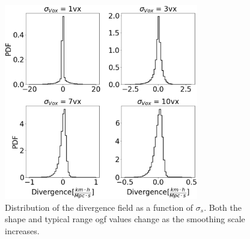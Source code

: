 \documentclass[usenatbib]{mnras}
\begin{document}
\begin{figure}
    \centering
    \includegraphics[width=240pt]{smooth_grad_dist.pdf}
    \caption{Distribution of the divergence field as a function of
      $\sigma_s$.
    Both the shape and typical range ogf values change as the
    smoothing scale increases.} 
    \label{fig:smooth_grad_dist}
\end{figure}
\end{document}
